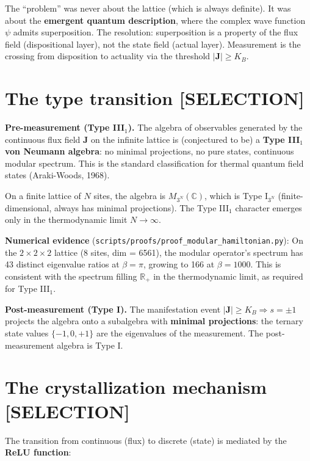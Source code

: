 \documentclass[
  11pt,
  letterpaper,
  twoside,
  openany]{book}
\makeatletter
\let\orig@section\section
\renewcommand{\section}{\needspace{8\baselineskip}\orig@section}
\makeatother
\begin{document}
The ``problem'' was never about the lattice (which is always definite).
It was about the \textbf{emergent quantum description}, where the
complex wave function \(\psi\) admits superposition. The resolution:
superposition is a property of the flux field (dispositional layer), not
the state field (actual layer). Measurement is the crossing from
disposition to actuality via the threshold \(|\mathbf{J}| \geq K_B\).

\section{The type transition
{[}SELECTION{]}}\label{the-type-transition-selection}

\textbf{Pre-measurement (Type III\(_1\)).} The algebra of observables
generated by the continuous flux field \(\mathbf{J}\) on the infinite
lattice is (conjectured to be) a \textbf{Type III\(_1\) von Neumann
algebra}: no minimal projections, no pure states, continuous modular
spectrum. This is the standard classification for thermal quantum field
states (Araki-Woods, 1968).

On a finite lattice of \(N\) sites, the algebra is
\(M_{3^N}(\mathbb{C})\), which is Type I\(_{3^N}\) (finite-dimensional,
always has minimal projections). The Type III\(_1\) character emerges
only in the thermodynamic limit \(N \to \infty\).

\textbf{Numerical evidence}
(\texttt{scripts/proofs/proof\_modular\_hamiltonian.py}): On the
\(2 \times 2 \times 2\) lattice (8 sites, dim = 6561), the modular
operator's spectrum has 43 distinct eigenvalue ratios at
\(\beta = \pi\), growing to 166 at \(\beta = 1000\). This is consistent
with the spectrum filling \(\mathbb{R}_+\) in the thermodynamic limit,
as required for Type III\(_1\).

\textbf{Post-measurement (Type I).} The manifestation event
\(|\mathbf{J}| \geq K_B \Rightarrow s = \pm 1\) projects the algebra
onto a subalgebra with \textbf{minimal projections}: the ternary state
values \(\{-1, 0, +1\}\) are the eigenvalues of the measurement. The
post-measurement algebra is Type I.

\section{The crystallization mechanism
{[}SELECTION{]}}\label{the-crystallization-mechanism-selection}

The transition from continuous (flux) to discrete (state) is mediated by
the \textbf{ReLU function}:
\end{document}
